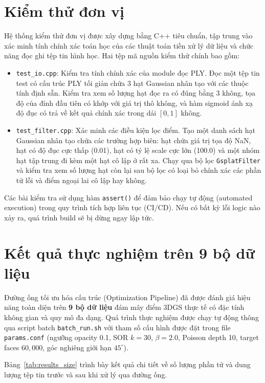 \documentclass[a4paper,12pt]{report}
\begin{document}
\section{Kiểm thử đơn vị}
Hệ thống kiểm thử đơn vị được xây dựng bằng C++ tiêu chuẩn, tập trung vào xác minh tính chính xác toán học của các thuật toán tiền xử lý dữ liệu và chức năng đọc ghi tệp tin hình học. Hai tệp mã nguồn kiểm thử chính bao gồm:
\begin{itemize}
    \item \texttt{test\_io.cpp}: Kiểm tra tính chính xác của module đọc PLY. Đọc một tệp tin test có cấu trúc PLY tối giản chứa 3 hạt Gaussian nhân tạo với các thuộc tính định sẵn. Kiểm tra xem số lượng hạt đọc ra có đúng bằng 3 không, tọa độ của đỉnh đầu tiên có khớp với giá trị thô không, và hàm sigmoid ánh xạ độ đục có trả về kết quả chính xác trong dải $[0,1]$ không.
    \item \texttt{test\_filter.cpp}: Xác minh các điều kiện lọc điểm. Tạo một danh sách hạt Gaussian nhân tạo chứa các trường hợp biên: hạt chứa giá trị tọa độ NaN, hạt có độ đục cực thấp (0.01), hạt có tỷ lệ scale cực lớn (100.0) và một nhóm hạt tập trung đi kèm một hạt cô lập ở rất xa. Chạy qua bộ lọc \texttt{GsplatFilter} và kiểm tra xem số lượng hạt còn lại sau bộ lọc có loại bỏ chính xác các phần tử lỗi và điểm ngoại lai cô lập hay không.
\end{itemize}

Các bài kiểm tra sử dụng hàm \texttt{assert()} để đảm bảo chạy tự động (automated execution) trong quy trình tích hợp liên tục (CI/CD). Nếu có bất kỳ lỗi logic nào xảy ra, quá trình build sẽ bị dừng ngay lập tức.

\section{Kết quả thực nghiệm trên 9 bộ dữ liệu}
Đường ống tối ưu hóa cấu trúc (Optimization Pipeline) đã được đánh giá hiệu năng toàn diện trên \textbf{9 bộ dữ liệu} đám mây điểm 3DGS thực tế có đặc tính không gian và quy mô đa dạng. Quá trình thực nghiệm được chạy tự động thông qua script batch \texttt{batch\_run.sh} với tham số cấu hình được đặt trong file \texttt{params.conf} (ngưỡng opacity 0.1, SOR $k=30$, $\beta=2.0$, Poisson depth 10, target faces $60{,}000$, góc nghiêng giới hạn $45^\circ$).

Bảng~\ref{tab:results_size} trình bày kết quả chi tiết về số lượng phần tử và dung lượng tệp tin trước và sau khi xử lý qua đường ống.
\end{document}

